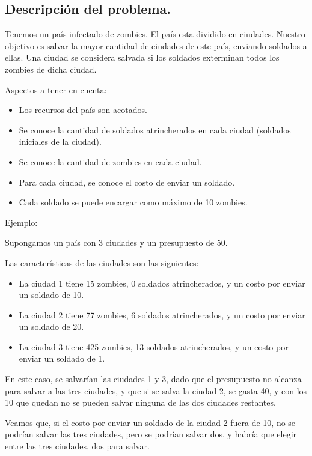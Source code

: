 \subsection{Descripción del problema.}

\vspace*{0.3cm}

Tenemos un país infectado de zombies. El país esta dividido en ciudades. Nuestro objetivo es salvar la mayor cantidad de ciudades de este país, enviando soldados a ellas. Una ciudad se considera salvada si los soldados exterminan todos los zombies de dicha ciudad.

Aspectos a tener en cuenta:

\begin{itemize}
   \item Los recursos del país son acotados.
   \item Se conoce la cantidad de soldados atrincherados en cada ciudad (soldados iniciales de la ciudad).
   \item Se conoce la cantidad de zombies en cada ciudad.
   \item Para cada ciudad, se conoce el costo de enviar un soldado.
   \item Cada soldado se puede encargar como máximo de 10 zombies.
\end{itemize}

Ejemplo:

Supongamos un país con 3 ciudades y un presupuesto de 50.

Las características de las ciudades son las siguientes:
\begin{itemize}
	\item La ciudad 1 tiene 15 zombies, 0 soldados atrincherados, y un costo por enviar un soldado de 10.
	\item La ciudad 2 tiene 77 zombies, 6 soldados atrincherados, y un costo por enviar un soldado de 20.
	\item La ciudad 3 tiene 425 zombies, 13 soldados atrincherados, y un costo por enviar un soldado de 1.
\end{itemize}

En este caso, se salvarían las ciudades 1 y 3, dado que el presupuesto no alcanza para salvar a las tres ciudades, y que si se salva la ciudad 2, se gasta 40, y con los 10 que quedan no se pueden salvar ninguna de las dos ciudades restantes.

Veamos que, si el costo por enviar un soldado de la ciudad 2 fuera de 10, no se podrían salvar las tres ciudades, pero se podrían salvar dos, y habría que elegir entre las tres ciudades, dos para salvar.

